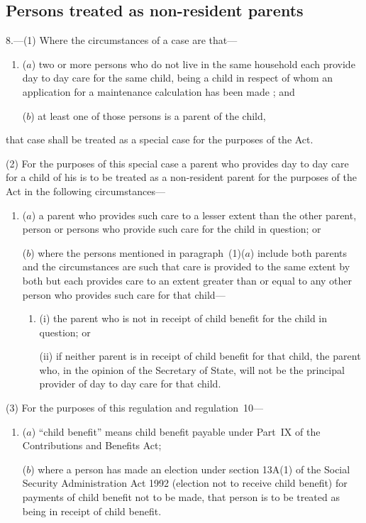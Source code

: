 \documentclass[12pt,a4paper]{article}
\begin{document}
\renewcommand\parthead{--- Part~III}

\subsection[8. Persons treated as non-resident parents]{Persons treated as non-resident parents}

8.---(1)  Where the circumstances of a case are that—
\begin{enumerate}\item[]
($a$) two or more persons who do not live in the same household each provide day to day care for the same 
child, being a child in respect of whom an application for a maintenance calculation has been made%
; and

($b$) at least one of those persons is a parent of the child,
\end{enumerate}
that case shall be treated as a special case for the purposes of the Act.

(2) For the purposes of this special case a parent who provides day to day care for a child of his is to be treated as a non-resident parent for the purposes of the Act in the following circumstances—
\begin{enumerate}\item[]
($a$) a parent who provides such care to a lesser extent than the other parent, person or persons who provide such care for the child in question; or

($b$) where the persons mentioned in paragraph~(1)($a$)  include both parents and the circumstances are such that care is provided to the same extent by both but each provides care to an extent greater than or equal to any other person who provides such care for that child—
\begin{enumerate}\item[]
(i) the parent who is not in receipt of child benefit for the child in question; or

(ii) if neither parent is in receipt of child benefit for that child, the parent who, in the opinion of the Secretary of State, will not be the principal provider of day to day care for that child.
\end{enumerate}
\end{enumerate}

(3) For the purposes of this regulation and regulation~10---
\begin{enumerate}\item[]
($a$)  %
“child benefit” means child benefit payable under Part~IX of the Contributions and Benefits Act;

($b$) where a person has made an election under section 13A(1) of the Social Security Administration Act 1992 (election not to receive child benefit) for payments of child benefit not to be made, that person is to be treated as being in receipt of child benefit.
\end{enumerate}
\end{document}
